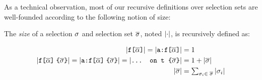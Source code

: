 As a technical observation, most of our recursive definitions over
selection sets are well-founded according to the following notion of
size:
\begin{definition}[\cite{gqlph}]
The \emph{size} of a selection $\sel$ and selection set $\sset$, noted $\ssize{\cdot}$, is recursively defined as:
\begin{small}
\begin{align*}
    \ssize{\fld}  = \ssize{\afld} &=  1\\
    \ssize{\nfld{\sset}} = \ssize{\anfld{\sset}} = \ssize{\ifrag{t}{\sset}} &= 1 + \ssize{\sset}\\
    \ssize{\sset} &= \textstyle\sum_{\sel_{i} \in\; \sset}{\ssize{\sel_{i}}}
    \end{align*}
\end{small}
\end{definition} 







